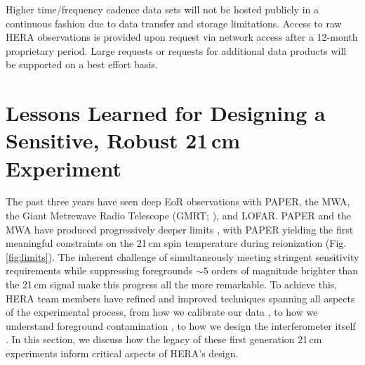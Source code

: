 \documentclass[preprint,11pt]{aastex}
\begin{document}
\noindent Higher time/frequency cadence data sets will not be hosted publicly in a continuous fashion 
due to data transfer and storage limitations.
Access to raw HERA observations is provided upon request via network access after a 12-month proprietary period.  
Large requests or requests for additional data products will be supported on a best effort basis.





\vspace{-18pt}
\section{Lessons Learned for Designing a Sensitive, Robust 21\,cm Experiment} \label{sec:lessons}
\vspace{-5pt}

\noindent The past three
years have seen deep EoR observations with PAPER, the MWA, 
the Giant Metrewave Radio Telescope (GMRT; \citealt{paciga_et_al2013}), and LOFAR.
PAPER and the MWA have produced progressively deeper limits
\citep{dillon_et_al2015,parsons_et_al2014,ali_et_al2015}, with PAPER
yielding the first meaningful constraints on the 21\,cm spin temperature during reionization
(Fig. \ref{fig:limits}).
The inherent challenge of simultaneously meeting stringent sensitivity requirements 
while suppressing foregrounds $\sim5$ orders of magnitude
brighter than the 21\,cm signal make this progress all the more remarkable.  
To achieve this, HERA team members have refined and improved 
techniques spanning all aspects of the experimental process, from how we
calibrate our data \citep{zheng_et_al2014, jacobs_et_al2016, barry_et_al2016}, to how we understand foreground contamination
\citep{moore_et_al2013,moore_et_al2016,thyagarajan_et_al2015a,pober_et_al2016},
to how we design the interferometer itself \citep{parsons_et_al2012a,dillon_parsons2016}.
In this section, we discuss how the legacy of these first generation
21\,cm experiments inform critical aspects of HERA's design.
\end{document}

